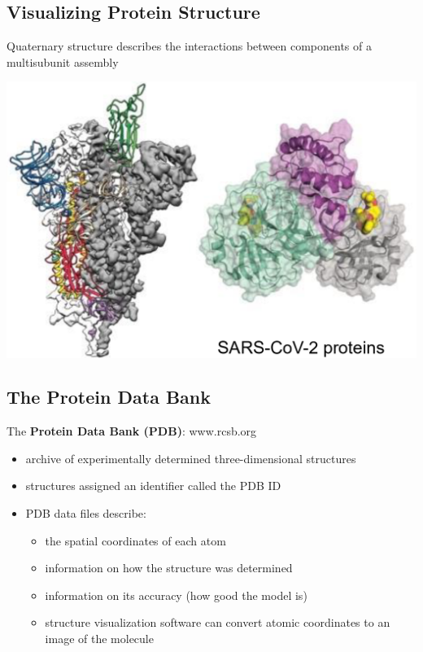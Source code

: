 \documentclass[10pt]{article}
\begin{document}
\subsection*{Visualizing Protein Structure}
Quaternary structure describes the interactions between components of a multisubunit assembly
\begin{center}
    \includegraphics*[scale=0.5]{L1_12.png}
\end{center}

\subsection*{The Protein Data Bank}
The \textbf{Protein Data Bank (PDB)}: www.rcsb.org
\begin{itemize}
    \item archive of experimentally determined three-dimensional structures
    \item structures assigned an identifier called the PDB ID
    \item PDB data files describe:
    \begin{itemize}
        \item the spatial coordinates of each atom
        \item information on how the structure was determined
        \item information on its accuracy (how good the model is)
        \item structure visualization software can convert atomic coordinates to an image of the molecule
    \end{itemize}
\end{itemize}
\end{document}
